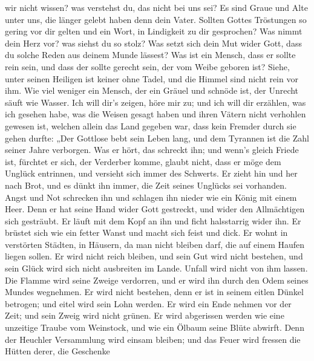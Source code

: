 wir nicht wissen? was verstehst du, das nicht bei uns sei? 
Es sind Graue und Alte unter uns, die länger gelebt haben denn dein
Vater.  Sollten Gottes Tröstungen so gering vor dir gelten
und ein Wort, in Lindigkeit zu dir gesprochen?  Was nimmt
dein Herz vor? was siehst du so stolz?  Was setzt sich dein
Mut wider Gott, dass du solche Reden aus deinem Munde lässest?
 Was ist ein Mensch, dass er sollte rein sein, und dass der
sollte gerecht sein, der vom Weibe geboren ist?  Siehe,
unter seinen Heiligen ist keiner ohne Tadel, und die Himmel sind nicht
rein vor ihm.  Wie viel weniger ein Mensch, der ein Gräuel
und schnöde ist, der Unrecht säuft wie Wasser.  Ich will
dir's zeigen, höre mir zu; und ich will dir erzählen, was ich gesehen
habe,  was die Weisen gesagt haben und ihren Vätern nicht
verhohlen gewesen ist,  welchen allein das Land gegeben
war, dass kein Fremder durch sie gehen durfte:  „Der
Gottlose bebt sein Leben lang, und dem Tyrannen ist die Zahl seiner
Jahre verborgen.  Was er hört, das schreckt ihn; und wenn's
gleich Friede ist, fürchtet er sich, der Verderber komme, 
glaubt nicht, dass er möge dem Unglück entrinnen, und versieht sich
immer des Schwerts.  Er zieht hin und her nach Brot, und es
dünkt ihn immer, die Zeit seines Unglücks sei vorhanden. 
Angst und Not schrecken ihn und schlagen ihn nieder wie ein König mit
einem Heer.  Denn er hat seine Hand wider Gott gestreckt,
und wider den Allmächtigen sich gesträubt.  Er läuft mit
dem Kopf an ihn und ficht halsstarrig wider ihn.  Er
brüstet sich wie ein fetter Wanst und macht sich feist und dick.
 Er wohnt in verstörten Städten, in Häusern, da man nicht
bleiben darf, die auf einem Haufen liegen sollen.  Er wird
nicht reich bleiben, und sein Gut wird nicht bestehen, und sein Glück
wird sich nicht ausbreiten im Lande.  Unfall wird nicht von
ihm lassen. Die Flamme wird seine Zweige verdorren, und er wird ihn
durch den Odem seines Mundes wegnehmen.  Er wird nicht
bestehen, denn er ist in seinem eitlen Dünkel betrogen; und eitel wird
sein Lohn werden.  Er wird ein Ende nehmen vor der Zeit;
und sein Zweig wird nicht grünen.  Er wird abgerissen
werden wie eine unzeitige Traube vom Weinstock, und wie ein Ölbaum seine
Blüte abwirft.  Denn der Heuchler Versammlung wird einsam
bleiben; und das Feuer wird fressen die Hütten derer, die Geschenke
